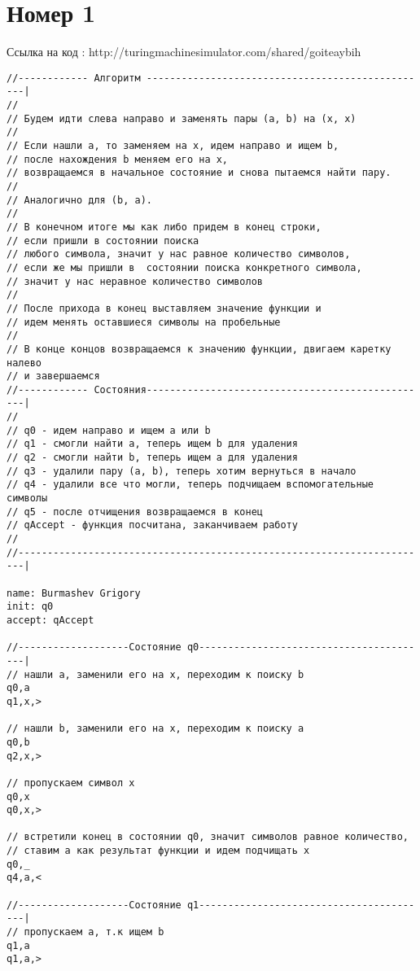 \documentclass[a4paper,12pt]{article}
\author{Бурмашев Григорий, БПМИ-208}
\title{}
\date{\today}
\begin{document}
\maketitle
\clearpage
\section*{Номер 1}
Ссылка на код : http://turingmachinesimulator.com/shared/goiteaybih

\begin{verbatim}
//------------ Алгоритм -------------------------------------------------|
//
// Будем идти слева направо и заменять пары (a, b) на (x, x)
// 
// Если нашли a, то заменяем на x, идем направо и ищем b, 
// после нахождения b меняем его на x,
// возвращаемся в начальное состояние и снова пытаемся найти пару.
//
// Аналогично для (b, a).
// 
// В конечном итоге мы как либо придем в конец строки,
// если пришли в состоянии поиска
// любого символа, значит у нас равное количество символов, 
// если же мы пришли в  состоянии поиска конкретного символа,
// значит у нас неравное количество символов
//
// После прихода в конец выставляем значение функции и
// идем менять оставшиеся символы на пробельные
// 
// В конце концов возвращаемся к значению функции, двигаем каретку налево
// и завершаемся
//------------ Состояния-------------------------------------------------|
//
// q0 - идем направо и ищем a или b      
// q1 - смогли найти a, теперь ищем b для удаления
// q2 - смогли найти b, теперь ищем a для удаления
// q3 - удалили пару (a, b), теперь хотим вернуться в начало 
// q4 - удалили все что могли, теперь подчищаем вспомогательные символы
// q5 - после отчищения возвращаемся в конец
// qAccept - функция посчитана, заканчиваем работу
//
//-----------------------------------------------------------------------|

name: Burmashev Grigory
init: q0
accept: qAccept

//-------------------Состояние q0----------------------------------------|
// нашли a, заменили его на x, переходим к поиску b
q0,a
q1,x,>

// нашли b, заменили его на x, переходим к поиску a
q0,b
q2,x,>

// пропускаем символ x
q0,x
q0,x,>

// встретили конец в состоянии q0, значит символов равное количество,
// ставим a как результат функции и идем подчищать x
q0,_
q4,a,<

//-------------------Состояние q1----------------------------------------|
// пропускаем a, т.к ищем b
q1,a
q1,a,>


\end{verbatim}
\end{document}
